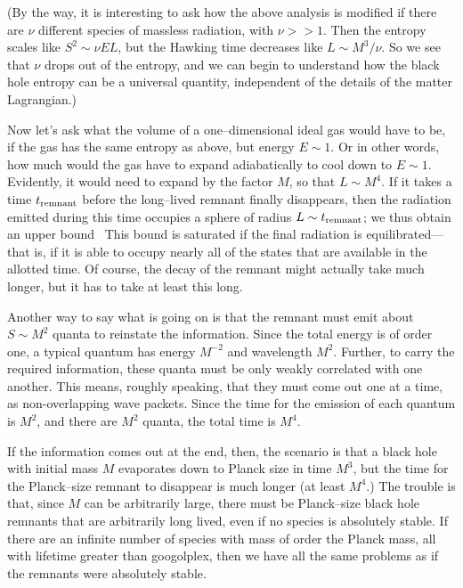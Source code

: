 (By the way, it is interesting to ask how the above analysis is modified if
there are $\nu$ different species of massless radiation, with $\nu>>1$.  Then
the entropy scales like $S^2\sim \nu EL$, but the Hawking time decreases like
$L\sim M^3/\nu$.  So  we see that $\nu$ drops out of the entropy\lref{}, and we can
begin to understand how the black hole entropy can be a universal quantity,
independent of the details of the matter Lagrangian.)

Now let's ask what the volume of a one--dimensional ideal gas would have to be,
if the gas has the same entropy as above, but energy $E\sim 1$.  Or in other
words, how much would the gas have to expand adiabatically to cool down to
$E\sim 1$.  Evidently, it would need to expand by the factor $M$, so that
$L\sim M^4$.  If it takes a time $t_{\rm remnant}$ before the long--lived
remnant finally disappears, then the radiation emitted during this time
occupies a sphere of radius $L\sim t_{\rm remnant}$; we thus
obtain an upper bound\carlitz\
\eqn{}
This bound is saturated if the final radiation is equilibrated---that is, if it
is able to occupy nearly all of the states that are available in the allotted
time.  Of course, the decay of the remnant might actually take much longer,
but it has to take at least this long.

Another way to say what is going on is that the remnant must emit about $S\sim
M^2$ quanta to reinstate the information.  Since the total energy is of order
one, a typical quantum has energy $M^{-2}$ and wavelength $M^2$.  Further, to
carry the required information, these quanta must be only weakly correlated
with one another.  This means, roughly speaking, that they must come out one at
a time, as non-overlapping wave packets.  Since the time for the emission of
each quantum is $M^2$, and there are $M^2$ quanta, the total time is $M^4$.

If the information comes out at the end, then, the scenario is that a black
hole with initial mass $M$ evaporates down to Planck size in time $M^3$, but
the time for the Planck--size remnant to disappear is much longer (at least
$M^4$.)  The trouble is that, since $M$ can be arbitrarily large, there must be
Planck--size black hole remnants that are arbitrarily long lived, even if no
species is absolutely stable.  If there are an infinite number of species with
mass of order the Planck mass, all with lifetime greater than googolplex, then
we have all the same problems as if the remnants were absolutely stable.

